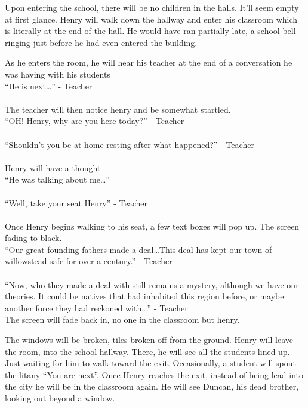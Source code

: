 \documentclass[12pt, a4paper, titlepage]{article}
\begin{document}
            Upon entering the school, there will be no children in the halls. It'll seem empty at first glance. Henry will walk down the hallway and enter 
            his classroom which is literally at the end of the hall. He would have ran partially late, a school bell ringing just before he had even entered the building.
            
            As he enters the room, he will hear his teacher at the end of a conversation he was having with his students\\
            
            ``He is next\ldots'' - Teacher\\~\\
            The teacher will then notice henry and be somewhat startled.\\
            ``OH! Henry, why are you here today?'' - Teacher\\~\\
            ``Shouldn't you be at home resting after what happened?'' - Teacher\\~\\
            Henry will have a thought\\
            ``He was talking about me\ldots''\\~\\
            ``Well, take your seat Henry'' - Teacher\\~\\
            Once Henry begins walking to his seat, a few text boxes will pop up. The screen fading to black.\\
            ``Our great founding fathers made a deal\ldots This deal has kept our town of willowstead safe for over a century.'' - Teacher\\~\\
            
            ``Now, who they made a deal with still remains a mystery, although we have our theories. It could be natives that had inhabited this region before, or maybe another force they had reckoned with\ldots'' - Teacher\\
            
            The screen will fade back in, no one in the classroom but henry. 
            
            The windows will be broken, tiles broken off from the ground. Henry will leave the room, into the school hallway. There, he will see all the students lined up. Just
            waiting for him to walk toward the exit. Occasionally, a student will spout the litany ``You are next''. Once Henry reaches the exit, instead of being lead into the city
            he will be in the classroom again. He will see Duncan, his dead brother, looking out beyond a window.
            
\end{document}
